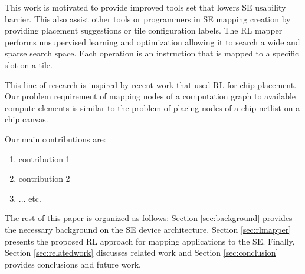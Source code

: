 This work is motivated to provide improved tools set that lowers SE usability barrier.
This also assist other tools or programmers in SE mapping creation by providing placement suggestions or tile configuration labels.
The RL mapper performs unsupervised learning and optimization allowing it to search a wide and sparse search space. 
Each operation is an instruction that is mapped to a specific slot on a tile.

This line of research is inspired by recent work that used RL for chip placement.
Our problem requirement of mapping nodes of a computation graph to available compute elements is similar to the problem of placing nodes of a chip netlist on a chip canvas. 

Our main contributions are:
\begin{enumerate}
    \item contribution 1
    \item contribution 2
    \item ... etc.
\end{enumerate}

The rest of this paper is organized as follows: Section \ref{sec:background} provides the necessary background on the SE device architecture.
Section \ref{sec:rlmapper} presents the proposed RL approach for mapping applications to the SE.
Finally, Section \ref{sec:relatedwork} discusses related work and Section \ref{sec:conclusion} provides conclusions and future work.